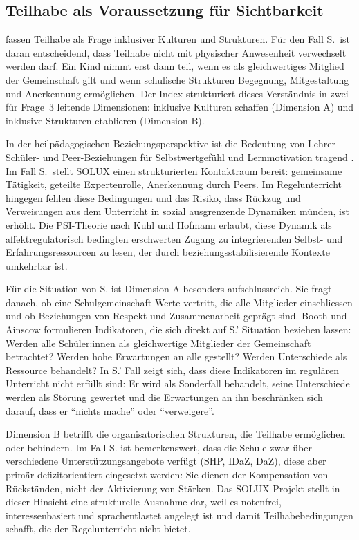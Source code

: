 \documentclass[ngerman, a4paper]{article}
\begin{document}
\subsection{Teilhabe als Voraussetzung für Sichtbarkeit}

\textcite[S.\,101--125]{booth2019index} fassen Teilhabe als Frage
inklusiver Kulturen und Strukturen. Für den Fall S.\ ist daran
entscheidend, dass Teilhabe nicht mit physischer Anwesenheit verwechselt
werden darf. Ein Kind nimmt erst dann teil, wenn es als gleichwertiges
Mitglied der Gemeinschaft gilt und wenn schulische Strukturen Begegnung,
Mitgestaltung und Anerkennung ermöglichen. Der Index strukturiert dieses
Verständnis in zwei für Frage~3 leitende Dimensionen: inklusive Kulturen
schaffen (Dimension A) und inklusive Strukturen etablieren (Dimension B).

In der heilpädagogischen Beziehungsperspektive ist die Bedeutung von
Lehrer-Schüler- und Peer-Beziehungen für Selbstwertgefühl und
Lernmotivation tragend
\parencite[S.\,88,\,91]{grossrieder2010anerkennung}. Im Fall S.\ stellt SOLUX
einen strukturierten Kontaktraum bereit: gemeinsame Tätigkeit, geteilte
Expertenrolle, Anerkennung durch Peers. Im Regelunterricht hingegen fehlen
diese Bedingungen und das Risiko, dass Rückzug und Verweisungen aus dem
Unterricht in sozial ausgrenzende Dynamiken münden, ist erhöht. Die
PSI-Theorie nach Kuhl und Hofmann erlaubt, diese Dynamik als affektregulatorisch
bedingten erschwerten Zugang zu integrierenden Selbst- und
Erfahrungsressourcen zu lesen, der durch beziehungsstabilisierende
Kontexte umkehrbar ist.

Für die Situation von S. ist Dimension A besonders aufschlussreich. Sie fragt danach,
ob eine Schulgemeinschaft Werte vertritt, die alle Mitglieder einschliessen und ob
Beziehungen von Respekt und Zusammenarbeit geprägt sind. Booth und Ainscow
formulieren Indikatoren, die sich direkt auf S.' Situation beziehen lassen: Werden alle
Schüler:innen als gleichwertige Mitglieder der Gemeinschaft betrachtet? Werden hohe
Erwartungen an alle gestellt? Werden Unterschiede als Ressource behandelt? In S.' Fall
zeigt sich, dass diese Indikatoren im regulären Unterricht nicht erfüllt sind: Er wird
als Sonderfall behandelt, seine Unterschiede werden als Störung gewertet und die
Erwartungen an ihn beschränken sich darauf, dass er \enquote{nichts mache} oder
\enquote{verweigere}.

Dimension B betrifft die organisatorischen Strukturen, die Teilhabe ermöglichen oder
behindern. Im Fall S. ist bemerkenswert, dass die Schule zwar über verschiedene
Unterstützungsangebote verfügt (SHP, IDaZ, DaZ), diese aber primär
defizitorientiert eingesetzt werden: Sie dienen der Kompensation von Rückständen,
nicht der Aktivierung von Stärken. Das SOLUX-Projekt stellt in dieser Hinsicht
eine strukturelle Ausnahme dar, weil es notenfrei, interessenbasiert und
sprachentlastet angelegt ist und damit Teilhabebedingungen schafft, die der
Regelunterricht nicht bietet.
\end{document}
